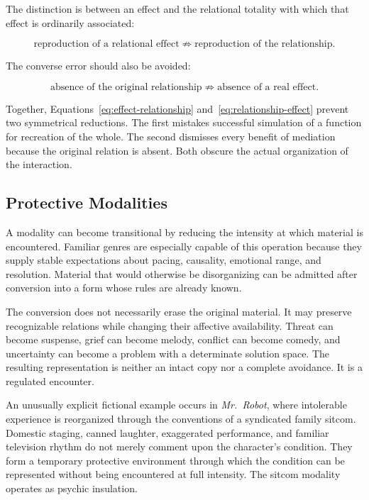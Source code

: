 \documentclass[11pt]{article}
\begin{document}
The distinction is between an effect and the relational totality with which
that effect is ordinarily associated:

\begin{equation}
  \text{reproduction of a relational effect}
  \not\Rightarrow
  \text{reproduction of the relationship}.
  \label{eq:effect-relationship}
\end{equation}

The converse error should also be avoided:

\begin{equation}
  \text{absence of the original relationship}
  \not\Rightarrow
  \text{absence of a real effect}.
  \label{eq:relationship-effect}
\end{equation}

Together, Equations~\ref{eq:effect-relationship}
and~\ref{eq:relationship-effect} prevent two symmetrical reductions. The first
mistakes successful simulation of a function for recreation of the whole. The
second dismisses every benefit of mediation because the original relation is
absent. Both obscure the actual organization of the interaction.

\subsection{Protective Modalities}

A modality can become transitional by reducing the intensity at which
material is encountered. Familiar genres are especially capable of this
operation because they supply stable expectations about pacing, causality,
emotional range, and resolution. Material that would otherwise be
disorganizing can be admitted after conversion into a form whose rules are
already known.

The conversion does not necessarily erase the original material. It may
preserve recognizable relations while changing their affective availability.
Threat can become suspense, grief can become melody, conflict can become
comedy, and uncertainty can become a problem with a determinate solution
space. The resulting representation is neither an intact copy nor a complete
avoidance. It is a regulated encounter.

An unusually explicit fictional example occurs in \emph{Mr.\ Robot}, where
intolerable experience is reorganized through the conventions of a syndicated
family sitcom. Domestic staging, canned laughter, exaggerated performance,
and familiar television rhythm do not merely comment upon the character's
condition. They form a temporary protective environment through which the
condition can be represented without being encountered at full intensity.
The sitcom modality operates as psychic insulation.
\end{document}
